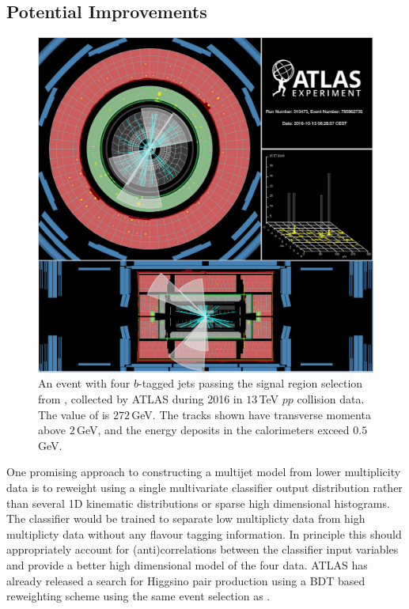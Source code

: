 \subsection{Potential Improvements}
\label{sec:improvements4b}

\begin{figure}
  \begin{center}
    \includegraphics[width=\linewidth]{figures/HH4b/272GeV.pdf}
    \caption{An event with four $b$-tagged jets passing the signal region selection from \cite{Aaboud:2018knk,Bryant:2644551},
      collected by ATLAS during 2016 in $13\,$TeV $pp$ collision data. The value of \mhh is $272\,$GeV.
      The tracks shown have transverse momenta above $2\,$GeV, and the energy deposits in the calorimeters exceed $0.5\,$GeV.}
    \label{fig:eventDisplay4b}
  \end{center}
\end{figure}

One promising approach to constructing a multijet model from lower \bjet multiplicity data is to reweight using a single multivariate classifier output distribution rather than several 1D kinematic distributions
or sparse high dimensional histograms.
The classifier would be trained to separate low \bjet multiplicty data from high \bjet multiplicty data without any flavour tagging information.
In principle this should appropriately account for (anti)correlations between the classifier input variables and provide a better high dimensional model of the four \bjet data.
ATLAS has already released a search for Higgsino pair production \cite{PhysRevD.98.092002} using a BDT based reweighting scheme using the same event selection as \cite{Aaboud:2018knk,Bryant:2644551}.

